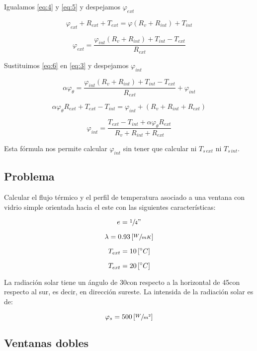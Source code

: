 \documentclass[12pt]{article}
\begin{document}
Igualamos \ref{eq:4} y \ref{eq:5} y despejamos $ \varphi _{ ext } $

\[ \varphi _{ ext } + R_{ ext } + T_{ ext } = \varphi \left( R_v + R_{ int } \right) + T_{ int } \]

\begin{equation}\label{eq:6}
    \varphi _{ ext } = \frac{ \varphi _{ int } \left( R_v + R_{ int } \right) + T_{ int } - T_{ ext } }{ R_{ ext } }
\end{equation}

Sustituimos \ref{eq:6} en \ref{eq:3} y despejamos $ \varphi _{ int } $

\[ \alpha \varphi _\theta = \frac{ \varphi _{ int } \left( R_v + R_{ int } \right) + T_{ int } - T_{ ext } }{ R_{ ext } } + \varphi_{ int } \]

\[ \alpha \varphi _ \theta R_{ ext } + T_{ ext } - T_{ int } = \varphi _{ int } + \left( R_v + R_{ int } + R_{ ext } \right) \]

\[  \boxed{ \varphi _{ int } = \frac{ T_{ ext } - T_{ int } + \alpha \varphi _\theta R_{ ext } }{ R_v + R_{ int } + R_{ ext } } } \]

Esta fórmula nos permite calcular $ \varphi _{ int } $ sin tener que calcular ni $ T_{ s \, ext }  $ ni $ T_{ s \, int } $.

\subsection*{Problema}

Calcular el flujo térmico y el perfil de temperatura asociado a una ventana con vidrio simple orientada hacia el este con las siguientes características:

\[ e = \sfrac{1}{4}" \]

\[ \lambda = 0.93 \left[ \sfrac{ W }{ m K } \right] \]

\[ T_{ ext } = 10 \left[ \degree C \right] \]

\[ T_{ ext } = 20 \left[ \degree C \right] \]

La radiación solar tiene un ángulo de 30\degree con respecto a la horizontal de 45\degree con respecto al sur, es decir, en dirección sureste. La intensida de la radiación solar es de:

\[ \varphi _s = 500 \left[ \sfrac{ W }{ m ^2 } \right] \]

\subsection{Ventanas dobles}
\end{document}
